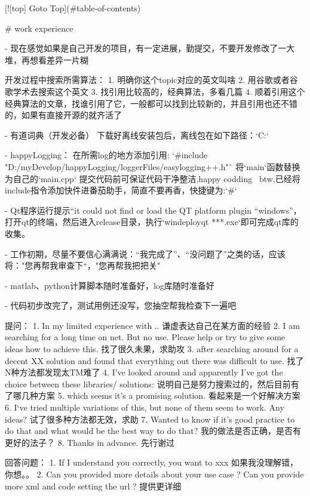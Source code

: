 [![top] Goto Top](#table-of-contents)

# work experience

- 现在感觉如果是自己开发的项目，有一定进展，勤提交，不要开发修改了一大堆，再想看差异一片糊

开发过程中搜索所需算法：
1. 明确你这个topic对应的英文叫啥
2. 用谷歌或者谷歌学术去搜索这个英文
3. 找引用比较高的，经典算法，多看几篇
4. 顺着引用这个经典算法的文章，找谁引用了它，一般都可以找到比较新的，并且引用也还不错的，如果有直接开源的就齐活了


- 有道词典（开发必备）
下载好离线安装包后，离线包在如下路径：`C:\Users{}\AppData\Local\Yodao\DeskDict\Dictionary`

- happyLogging：
在所需log的地方添加引用:
`#include "D:/myDevelop/happyLogging/loggerFiles/easylogging++.h"`
将`main`函数替换为自己的`main.cpp`
提交代码前可保证代码干净整洁,happy codding~
btw,已经将include指令添加快件进番茄助手，简直不要再香，快捷键为:`#`

- Qt程序运行提示“it could not find or load the QT platform plugin “windows”，打开qt的终端，然后进入release目录，执行`windeployqt ***.exe`即可完成qt库的收集。

- 工作初期，尽量不要信心满满说：“我完成了”、“没问题了”之类的话，应该将："您再帮我审查下“，"您再帮我把把关"

- matlab、python计算脚本随时准备好，log库随时准备好

- 代码初步改完了，测试用例还没写，您抽空帮我检查下一遍吧


提问：
1. In my limited experience with ..    谦虚表达自己在某方面的经验
2. I am searching for a long time on net. But no use. Please help or try to give some ideas how to achieve this.   找了很久未果，求助攻
3. after searching around for a decent XX solution and found that everything out there was difficult to use.  找了N种方法都发现太TM难了
4. I've looked around and apparently I've got the choice between these libraries/ solutions:   说明自己是努力搜索过的，然后目前有了哪几种方案
5. which seems it's a promising solution.  看起来是一个好解决方案
6. I`ve tried multiple variations of this, but none of them seem to work. Any ideas? 试了很多种方法都无效，求助
7. Wanted to know if it's good practice to do that and what would be the best way to do that? 我的做法是否正确，是否有更好的法子？
8. Thanks in advance.   先行谢过

回答问题：
1. If I understand you correctly, you want to xxx      如果我没理解错，你想。。
2. Can you provided more details about your use case ? Can you provide more xml and code setting the url ? 提供更详细

